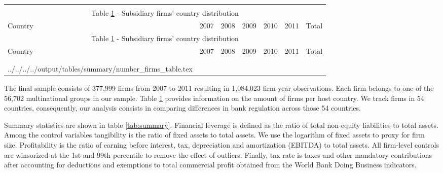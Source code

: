 \documentclass[12pt]{article}
\makeatletter
\newcommand\primitiveinput[1]
{\@@input #1 }
\makeatother
\begin{document}
		\begin{small}
		{
			\begin{longtable}{lrrrrrr}\\
				\label{tab:number of firms}\\
				\multicolumn{7}{c}{Table \ref{tab:number of firms} - Subsidiary firms' country distribution}\\
				\hline \hline \addlinespace Country & 2007 & 2008 & 2009 & 2010 & 2011 & Total  \\
				\endfirsthead
				\multicolumn{7}{c}{Table \ref{tab:number of firms} - Subsidiary firms' country distribution}\\
				\hline \hline \addlinespace Country & 2007 & 2008 & 2009 & 2010 & 2011 & Total  \\
				\hline \addlinespace \endhead
				\hline
				\multicolumn{7}{r}{{\textit{(Continued)}}}\\ \endfoot
				\\ 	
				\endlastfoot
				\primitiveinput{../../../../output/tables/summary/number_firms_table.tex}
				\hline 			
			\end{longtable}	
		}
	\end{small}
	
	The final sample consists of 377,999 firms from 2007 to 2011 resulting in 1,084,023 firm-year observations. Each firm belongs to one of the 56,702 multinational groups in our sample. Table \ref{tab:number of firms} provides information on the amount of firms per host country. We track firms in 54 countries, consequently, our analysis consists in comparing differences in bank regulation across those 54 countries. 
	
	Summary statistics are shown in table \ref{tab:summary}. Financial leverage is defined as the ratio of total non-equity liabilities to total assets. Among the control variables tangibility is the ratio of fixed assets to total assets. We use the logarithm of fixed assets to proxy for firm size. Profitability is the ratio of earning before interest, tax, depreciation and amortization (EBITDA) to total assets. All firm-level controls are winsorized at the 1st and 99th percentile to remove the effect of outliers. Finally, tax rate is taxes and other mandatory contributions after accounting for deductions and exemptions to total commercial profit obtained from the World Bank Doing Business indicators. 
	
\end{document}
